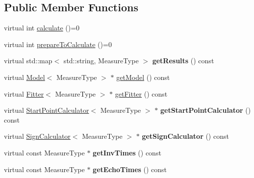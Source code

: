 \subsection*{Public Member Functions}
\begin{DoxyCompactItemize}
\item 
virtual int \hyperlink{class_ox_1_1_calculator_a9638894f2ec526b68f46f02122bae0c3}{calculate} ()=0
\item 
virtual int \hyperlink{class_ox_1_1_calculator_a01267c4e842b35f7eacaa9aacdd7e766}{prepare\+To\+Calculate} ()=0
\item 
virtual std\+::map$<$ std\+::string, Measure\+Type $>$ {\bfseries get\+Results} () const \hypertarget{class_ox_1_1_calculator_a4b04d48cb906764aa235c387b631dca4}{}\label{class_ox_1_1_calculator_a4b04d48cb906764aa235c387b631dca4}

\item 
virtual \hyperlink{class_ox_1_1_model}{Model}$<$ Measure\+Type $>$ $\ast$ \hyperlink{class_ox_1_1_calculator_a5589bf7b93a2d1e106532c35745f4329}{get\+Model} () const 
\item 
virtual \hyperlink{class_ox_1_1_fitter}{Fitter}$<$ Measure\+Type $>$ $\ast$ \hyperlink{class_ox_1_1_calculator_af648a7c6c957c9f51532f15c93147d62}{get\+Fitter} () const 
\item 
virtual \hyperlink{class_ox_1_1_start_point_calculator}{Start\+Point\+Calculator}$<$ Measure\+Type $>$ $\ast$ {\bfseries get\+Start\+Point\+Calculator} () const \hypertarget{class_ox_1_1_calculator_ad43fbbb3e888e1fa73f95d872a963bac}{}\label{class_ox_1_1_calculator_ad43fbbb3e888e1fa73f95d872a963bac}

\item 
virtual \hyperlink{class_ox_1_1_sign_calculator}{Sign\+Calculator}$<$ Measure\+Type $>$ $\ast$ {\bfseries get\+Sign\+Calculator} () const \hypertarget{class_ox_1_1_calculator_a4ee7fdeb4009d2e433ef6a566768eb25}{}\label{class_ox_1_1_calculator_a4ee7fdeb4009d2e433ef6a566768eb25}

\item 
virtual const Measure\+Type $\ast$ {\bfseries get\+Inv\+Times} () const \hypertarget{class_ox_1_1_calculator_ab844b24dfedd27d52466203ec0c913fa}{}\label{class_ox_1_1_calculator_ab844b24dfedd27d52466203ec0c913fa}

\item 
virtual const Measure\+Type $\ast$ {\bfseries get\+Echo\+Times} () const \hypertarget{class_ox_1_1_calculator_a6a46eb89732759c2544398f9a694f5c7}{}\label{class_ox_1_1_calculator_a6a46eb89732759c2544398f9a694f5c7}


\end{DoxyCompactItemize}
